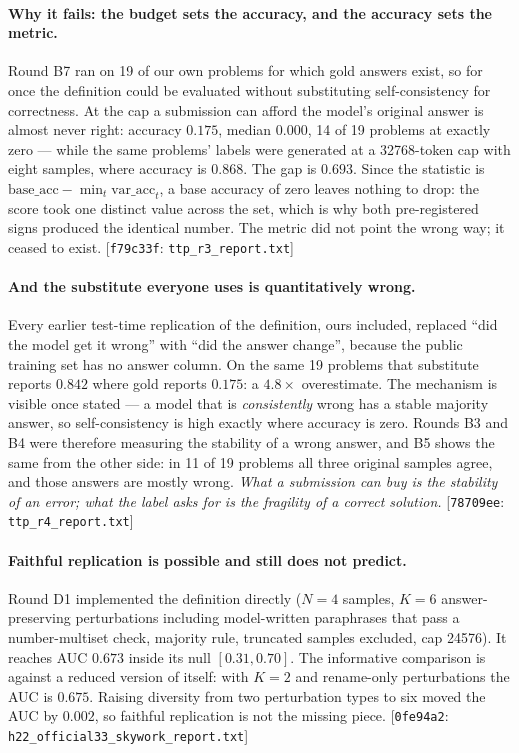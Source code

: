 \documentclass[10pt]{article}
\newcommand{\cmt}[2]{{\footnotesize\textsf{[}\texttt{#1}\textsf{:} #2\textsf{]}}}
\begin{document}
\paragraph{Why it fails: the budget sets the accuracy, and the accuracy sets the metric.} Round B7
ran on 19 of our own problems for which gold answers exist, so for once the definition could be
evaluated without substituting self-consistency for correctness. At the cap a submission can afford
the model's original answer is almost never right: accuracy $\mathbf{0.175}$, median $0.000$, 14 of
19 problems at exactly zero --- while the same problems' labels were generated at a 32768-token cap
with eight samples, where accuracy is $\mathbf{0.868}$. The gap is $\mathbf{0.693}$. Since the
statistic is $\text{base\_acc} - \min_t \text{var\_acc}_t$, a base accuracy of zero leaves nothing
to drop: the score took one distinct value across the set, which is why both pre-registered signs
produced the identical number. The metric did not point the wrong way; it ceased to exist.
\cmt{f79c33f}{\texttt{ttp\_r3\_report.txt}}

\paragraph{And the substitute everyone uses is quantitatively wrong.} Every earlier test-time
replication of the definition, ours included, replaced ``did the model get it wrong'' with ``did the
answer change'', because the public training set has no answer column. On the same 19 problems that
substitute reports $0.842$ where gold reports $0.175$: a $\mathbf{4.8\times}$ overestimate. The
mechanism is visible once stated --- a model that is \emph{consistently} wrong has a stable majority
answer, so self-consistency is high exactly where accuracy is zero. Rounds B3 and B4 were therefore
measuring the stability of a wrong answer, and B5 shows the same from the other side: in 11 of 19
problems all three original samples agree, and those answers are mostly wrong. \emph{What a
submission can buy is the stability of an error; what the label asks for is the fragility of a
correct solution.} \cmt{78709ee}{\texttt{ttp\_r4\_report.txt}}

\paragraph{Faithful replication is possible and still does not predict.} Round D1 implemented the
definition directly ($N{=}4$ samples, $K{=}6$ answer-preserving perturbations including model-written
paraphrases that pass a number-multiset check, majority rule, truncated samples excluded, cap 24576).
It reaches AUC $0.673$ inside its null $[0.31, 0.70]$. The informative comparison is against a
reduced version of itself: with $K{=}2$ and rename-only perturbations the AUC is $0.675$. Raising
diversity from two perturbation types to six moved the AUC by $0.002$, so faithful replication is
not the missing piece. \cmt{0fe94a2}{\texttt{h22\_official33\_skywork\_report.txt}}
\end{document}
